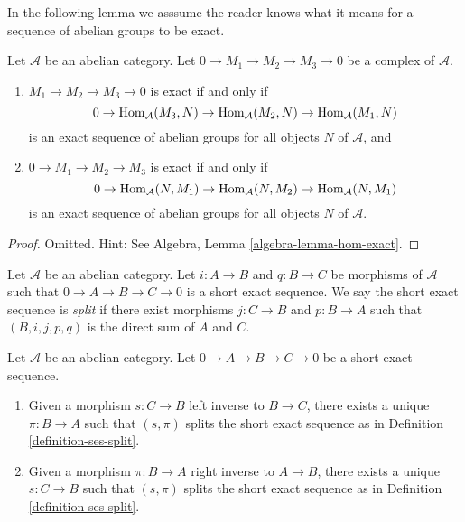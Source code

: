 \noindent
In the following lemma we asssume the reader knows what it means
for a sequence of abelian groups to be exact.

\begin{lemma}
\label{lemma-check-exactness}
Let $\mathcal{A}$ be an abelian category.
Let $0 \to M_1 \to M_2 \to M_3 \to 0$ be a complex of $\mathcal{A}$.
\begin{enumerate}
\item $M_1 \to M_2 \to M_3 \to 0$ is exact if and only if
$$
0 \to \mathop{\rm Hom}\nolimits_\mathcal{A}(M_3, N) \to
\mathop{\rm Hom}\nolimits_\mathcal{A}(M_2, N) \to \mathop{\rm Hom}\nolimits_\mathcal{A}(M_1, N)
$$
is an exact sequence of abelian groups for all objects $N$ of
$\mathcal{A}$, and
\item $0 \to M_1 \to M_2 \to M_3$ is exact if and only if
$$
0 \to \mathop{\rm Hom}\nolimits_\mathcal{A}(N, M_1) \to \mathop{\rm Hom}\nolimits_\mathcal{A}(N, M_2) \to
\mathop{\rm Hom}\nolimits_\mathcal{A}(N, M_1)
$$
is an exact sequence of abelian groups for all objects $N$ of $\mathcal{A}$.
\end{enumerate}
\end{lemma}

\begin{proof}
Omitted. Hint: See
Algebra, Lemma \ref{algebra-lemma-hom-exact}.
\end{proof}

\begin{definition}
\label{definition-ses-split}
Let $\mathcal{A}$ be an abelian category.
Let $i : A \to B$ and $q : B \to C$ be morphisms
of $\mathcal{A}$ such that
$0 \to A \to B \to C \to 0$ is a short
exact sequence. We say the short exact
sequence is {\it split} if there exist
morphisms $j : C \to B$ and $p : B \to A$ such
that $(B, i, j, p, q)$ is the direct sum of $A$ and $C$.
\end{definition}

\begin{lemma}
\label{lemma-ses-split}
Let $\mathcal{A}$ be an abelian category.
Let $0 \to A \to B \to C \to 0$
be a short exact sequence.
\begin{enumerate}
\item Given a morphism $s : C \to B$ left inverse to
$B \to C$, there exists a unique $\pi : B \to A$
such that $(s, \pi)$ splits the short exact sequence
as in Definition \ref{definition-ses-split}.
\item Given a morphism $\pi : B \to A$ right inverse to
$A \to B$, there exists a unique $s : C \to B$
such that $(s, \pi)$ splits the short exact sequence
as in Definition \ref{definition-ses-split}.
\end{enumerate}
\end{lemma}

